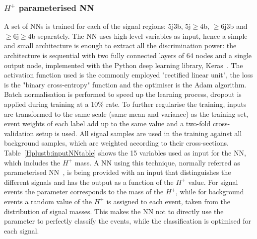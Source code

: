 \subsubsection{$H^+$ parameterised NN}
\label{sec:HplusPNN}
A set of NNs is trained for each of the signal regions: 5j3b, 5j$\geq$4b, $\geq$6j3b and $\geq$6j$\geq$4b separately. The NN uses high-level variables as input, hence a simple and small architecture is enough to extract all the discrimination power: the architecture is sequential with two fully connected layers of 64 nodes and a single output node, implemented with the Python deep learning library, Keras~\cite{chollet2015keras}. The activation function used is the commonly employed "rectified linear unit", the loss is the "binary cross-entropy" function and the optimiser is the Adam algorithm. Batch normalisation is performed to speed up the learning process, dropout is applied during training at a 10\% rate. To further regularise the training, inputs are transformed to the same scale (same mean and variance) as the training set, event weights of each label add up to the same value and a two-fold cross-validation setup is used. All signal samples are used in the training against all background samples, which are weighted according to their cross-sections. Table~\ref{Hplustb:inputNNtable} shows the 15 variables used as input for the NN, which includes the $H^+$ mass. A NN using this technique, normally referred as parameterised NN~\cite{Baldi_2016}, is being provided with an input that distinguishes the different signals and has the output as a function of the $H^+$ value. For signal events the parameter corresponds to the mass of the $H^+$, while for background events a random value of the $H^+$ is assigned to each event, taken from the distribution of signal masses. This makes the NN not to directly use the parameter to perfectly classify the events, while the classification is optimised for each signal.

